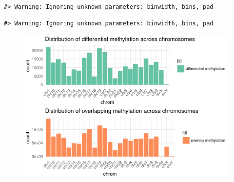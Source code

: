 \begin{verbatim}
#> Warning: Ignoring unknown parameters: binwidth, bins, pad
\end{verbatim}

\begin{Shaded}
\begin{Highlighting}[]
\NormalTok{(}\NormalTok{(}\NormalTok{(}\NormalTok{, }\NormalTok{(}\NormalTok{))+}\NormalTok{(} \NormalTok{)+}\NormalTok{()+}\NormalTok{(}\NormalTok{)+}\NormalTok{(} \NormalTok{(} \NormalTok{, } \NormalTok{))}
\end{Highlighting}
\end{Shaded}

\begin{verbatim}
#> Warning: Ignoring unknown parameters: binwidth, bins, pad
\end{verbatim}

\begin{Shaded}
\begin{Highlighting}[]
 \NormalTok{, }\NormalTok{)}
\end{Highlighting}
\end{Shaded}
\begin{figure}
\begin{center}\includegraphics{unnamed-chunk-8-1} \end{center}
\end{figure}
